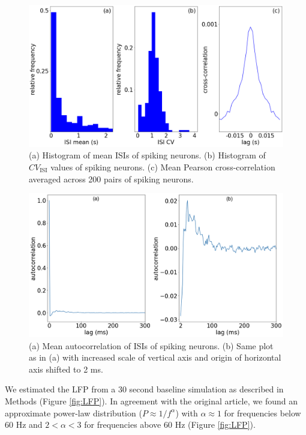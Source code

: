 \begin{figure}[H]
    \centering
    \includegraphics[scale=0.3]{Figures/Fig2.png}
    \caption{(a) Histogram of mean ISIs of spiking neurons. (b) Histogram of $CV_{\text{ISI}}$ values of spiking neurons. (c) Mean Pearson cross-correlation averaged across 200 pairs of spiking neurons.}
    \label{fig:fig2}
\end{figure}

\begin{figure}[H]
    \centering
    \includegraphics[scale=0.3]{Figures/Fig3.png}
    \caption{(a) Mean autocorrelation of ISIs of spiking neurons. (b) Same plot as in (a) with increased scale of vertical axis and origin of horizontal axis shifted to 2 ms.}
    \label{fig:fig3}
\end{figure}

We estimated the LFP from a 30 second baseline simulation as described in Methods (Figure \ref{fig:LFP}). In agreement with the original article, we found an approximate power-law distribution ($P \approx 1/f^{\alpha}$) with $\alpha \approx 1$ for frequencies below 60 Hz %
and $2 < \alpha < 3$ for frequencies above 60 Hz (Figure \ref{fig:LFP}).\\

